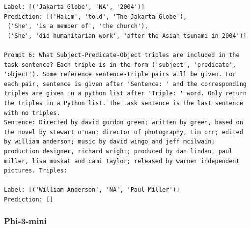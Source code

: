 \documentclass{article}
\begin{document}
\begin{lstlisting}
Label: [('Jakarta Globe', 'NA', '2004')]
Prediction: [('Halim', 'told', 'The Jakarta Globe'),
 ('She', 'is a member of', 'the church'),
 ('She', 'did humanitarian work', 'after the Asian tsunami in 2004')]

Prompt 6: What Subject-Predicate-Object triples are included in the task sentence? Each triple is in the form ('subject', 'predicate', 'object'). Some reference sentence-triple pairs will be given. For each pair, sentence is given after 'Sentence: ' and the corresponding triples are given in a python list after 'Triple: ' word. Only return the triples in a Python list. The task sentence is the last sentence with no triples.
Sentence: Directed by david gordon green; written by green, based on the novel by stewart o'nan; director of photography, tim orr; edited by william anderson; music by david wingo and jeff mcilwain; production designer, richard wright; produced by dan lindau, paul miller, lisa muskat and cami taylor; released by warner independent pictures. Triples:

Label: [('William Anderson', 'NA', 'Paul Miller')]
Prediction: []
\end{lstlisting}
\subsubsection{Phi-3-mini}
\end{document}
